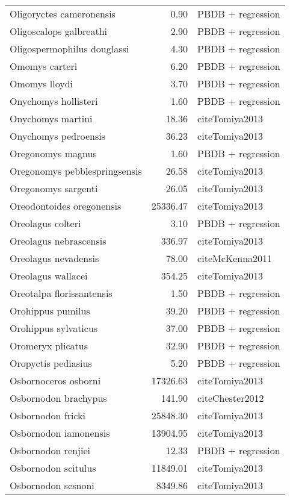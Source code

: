 \begin{table}[ht]
\begin{tabular}{lrl}
  Oligoryctes cameronensis & 0.90 & PBDB + regression \\ 
  Oligoscalops galbreathi & 2.90 & PBDB + regression \\ 
  Oligospermophilus douglassi & 4.30 & PBDB + regression \\ 
  Omomys carteri & 6.20 & PBDB + regression \\ 
  Omomys lloydi & 3.70 & PBDB + regression \\ 
  Onychomys hollisteri & 1.60 & PBDB + regression \\ 
  Onychomys martini & 18.36 & cite{Tomiya2013} \\ 
  Onychomys pedroensis & 36.23 & cite{Tomiya2013} \\ 
  Oregonomys magnus & 1.60 & PBDB + regression \\ 
  Oregonomys pebblespringsensis & 26.58 & cite{Tomiya2013} \\ 
  Oregonomys sargenti & 26.05 & cite{Tomiya2013} \\ 
  Oreodontoides oregonensis & 25336.47 & cite{Tomiya2013} \\ 
  Oreolagus colteri & 3.10 & PBDB + regression \\ 
  Oreolagus nebrascensis & 336.97 & cite{Tomiya2013} \\ 
  Oreolagus nevadensis & 78.00 & cite{McKenna2011} \\ 
  Oreolagus wallacei & 354.25 & cite{Tomiya2013} \\ 
  Oreotalpa florissantensis & 1.50 & PBDB + regression \\ 
  Orohippus pumilus & 39.20 & PBDB + regression \\ 
  Orohippus sylvaticus & 37.00 & PBDB + regression \\ 
  Oromeryx plicatus & 32.90 & PBDB + regression \\ 
  Oropyctis pediasius & 5.20 & PBDB + regression \\ 
  Osbornoceros osborni & 17326.63 & cite{Tomiya2013} \\ 
  Osbornodon brachypus & 141.90 & cite{Chester2012} \\ 
  Osbornodon fricki & 25848.30 & cite{Tomiya2013} \\ 
  Osbornodon iamonensis & 13904.95 & cite{Tomiya2013} \\ 
  Osbornodon renjiei & 12.33 & PBDB + regression \\ 
  Osbornodon scitulus & 11849.01 & cite{Tomiya2013} \\ 
  Osbornodon sesnoni & 8349.86 & cite{Tomiya2013} \\ 

\end{tabular}
\end{table}

